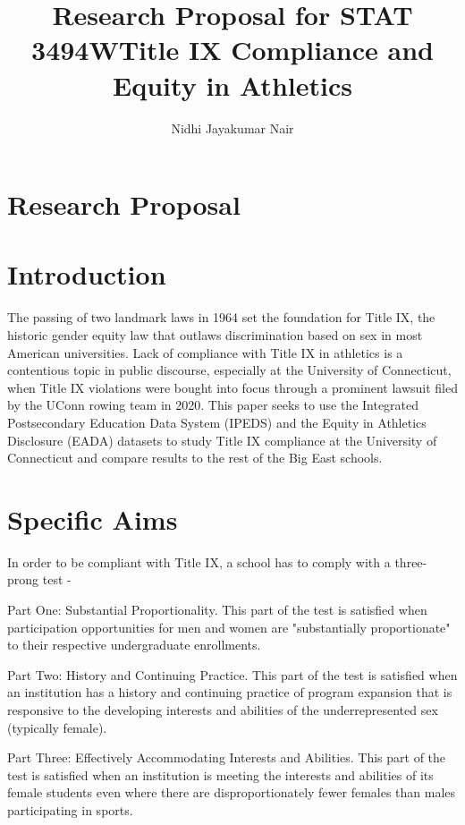 \documentclass{article}
\title{Research Proposal for STAT 3494W}
\author{Nidhi Jayakumar Nair}
\title{Title IX Compliance and Equity in Athletics}
\begin{document}
       
\maketitle

\section*{Research Proposal}

\section{Introduction}

The passing of two landmark laws in 1964 set the foundation for Title IX, the historic gender equity law that outlaws discrimination based on sex in most American universities. Lack of compliance with Title IX in athletics is a contentious topic in public discourse, especially at the University of Connecticut, when Title IX violations were bought into focus through a prominent lawsuit filed by the UConn rowing team in 2020. This paper seeks to use the Integrated Postsecondary Education Data System (IPEDS) and the Equity in Athletics Disclosure (EADA) datasets to study Title IX compliance at the University of Connecticut and compare results to the rest of the Big East schools. 

\section{Specific Aims}

In order to be compliant with Title IX, a school has to comply with a three-prong test -

Part One: Substantial Proportionality. This part of the test is satisfied when participation opportunities for men and women are "substantially proportionate" to their respective undergraduate enrollments. 

Part Two: History and Continuing Practice. This part of the test is satisfied when an institution has a history and continuing practice of program expansion that is responsive to the developing interests and abilities of the underrepresented sex (typically female). 

Part Three: Effectively Accommodating Interests and Abilities. This part of the test is satisfied when an institution is meeting the interests and abilities of its female students even where there are disproportionately fewer females than males participating in sports.
\end{document}
